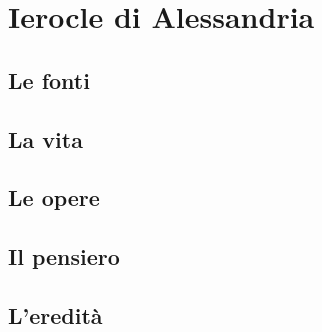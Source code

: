 \chapter{Ierocle di Alessandria}

\section{Le fonti}

\section{La vita}

\section{Le opere}

\section{Il pensiero}

\section{L'eredità}
